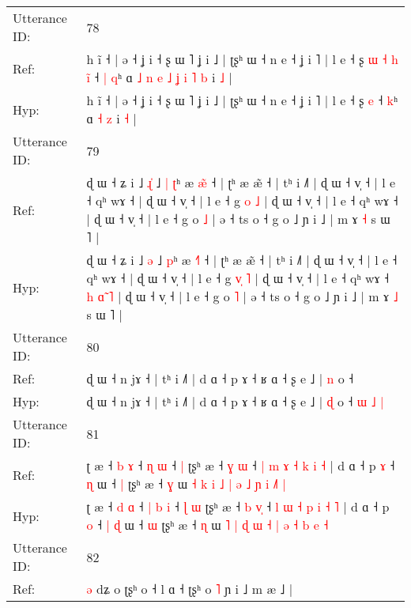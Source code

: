 \documentclass[10pt]{article}
\DeclareRobustCommand{\hl}[1]{{\textcolor{red}{#1}}}
\begin{document}
\begin{longtable}{ll}
\midrule
Utterance ID: & 78 \\
Ref: & h ĩ ˧ | ə ˧ ʝ i ˧ ʂ ɯ ˥ ʝ i ˩ | ʈʂʰ ɯ ˧ n e ˧ ʝ i ˥ | l e ˧ ʂ\hl{ }\hl{ɯ}\hl{ }\hl{˧}\hl{ }\hl{h} \hl{i}\hl{̃} ˧\hl{ }\hl{|} \hl{q}ʰ ɑ\hl{ }\hl{˩}\hl{ }\hl{n}\hl{ }\hl{e}\hl{ }\hl{˩}\hl{ }\hl{ʝ}\hl{ }\hl{i} \hl{˥} \hl{b} i \hl{˩} |
 \\
Hyp: & h ĩ ˧ | ə ˧ ʝ i ˧ ʂ ɯ ˥ ʝ i ˩ | ʈʂʰ ɯ ˧ n e ˧ ʝ i ˥ | l e ˧ ʂ\hl{}\hl{}\hl{}\hl{}\hl{}\hl{} \hl{}\hl{e} ˧\hl{}\hl{} \hl{k}ʰ ɑ\hl{}\hl{}\hl{}\hl{}\hl{}\hl{}\hl{}\hl{}\hl{}\hl{}\hl{}\hl{} \hl{˧} \hl{z} i \hl{˧} |
 \\
\midrule
Utterance ID: & 79 \\
Ref: & ɖ ɯ ˧ ʑ i ˩ \hl{ɻ}\hl{̍} ˩\hl{ }\hl{|} \hl{ʈ}ʰ æ \hl{æ}\hl{̃} ˧ | ʈʰ æ æ̃ ˧ | tʰ i ˩˥ | ɖ ɯ ˧ v̩ ˧ | l e ˧ qʰ wɤ ˧ | ɖ ɯ ˧ v̩ ˧ | l e ˧ g \hl{}\hl{o} \hl{˩} | ɖ ɯ ˧ v̩ ˧ | l e ˧ qʰ wɤ ˧\hl{}\hl{}\hl{}\hl{}\hl{}\hl{}\hl{} | ɖ ɯ ˧ v̩ ˧ | l e ˧ g o \hl{˩} | ə ˧ ts o ˧ g o ˩ ɲ i ˩ | m ɤ \hl{˧} s ɯ ˥ |
 \\
Hyp: & ɖ ɯ ˧ ʑ i ˩ \hl{}\hl{ə} ˩\hl{}\hl{} \hl{p}ʰ æ \hl{˧}\hl{˥} ˧ | ʈʰ æ æ̃ ˧ | tʰ i ˩˥ | ɖ ɯ ˧ v̩ ˧ | l e ˧ qʰ wɤ ˧ | ɖ ɯ ˧ v̩ ˧ | l e ˧ g \hl{v}\hl{̩} \hl{˥} | ɖ ɯ ˧ v̩ ˧ | l e ˧ qʰ wɤ ˧\hl{ }\hl{h}\hl{ }\hl{ɑ}\hl{̃}\hl{ }\hl{˥} | ɖ ɯ ˧ v̩ ˧ | l e ˧ g o \hl{˥} | ə ˧ ts o ˧ g o ˩ ɲ i ˩ | m ɤ \hl{˩} s ɯ ˥ |
 \\
\midrule
Utterance ID: & 80 \\
Ref: & ɖ ɯ ˧ n jɤ ˧ | tʰ i ˩˥ | d ɑ ˧ p ɤ ˧ ʁ ɑ ˧ ʂ e ˩ | \hl{n} o ˧\hl{}\hl{}\hl{}\hl{}\hl{}\hl{}
 \\
Hyp: & ɖ ɯ ˧ n jɤ ˧ | tʰ i ˩˥ | d ɑ ˧ p ɤ ˧ ʁ ɑ ˧ ʂ e ˩ | \hl{ɖ} o ˧\hl{ }\hl{ɯ}\hl{ }\hl{˩}\hl{ }\hl{|}
 \\
\midrule
Utterance ID: & 81 \\
Ref: & ʈ æ ˧ \hl{b} \hl{ɤ} ˧\hl{}\hl{} \hl{ɳ} \hl{ɯ} ˧\hl{}\hl{} \hl{|} ʈʂʰ æ ˧ \hl{ɣ} \hl{}\hl{ɯ} ˧ \hl{|} \hl{m} \hl{ɤ} \hl{˧} \hl{k} \hl{i} \hl{˧} | d ɑ ˧ p \hl{ɤ} ˧\hl{}\hl{} \hl{ɳ} ɯ ˧ \hl{|} ʈʂʰ æ ˧ \hl{ɣ} ɯ \hl{˧} \hl{k} \hl{i} \hl{˩} \hl{|} \hl{ə} \hl{˩} \hl{ɲ} \hl{i} \hl{˩}\hl{˥} \hl{|}
 \\
Hyp: & ʈ æ ˧ \hl{d} \hl{ɑ} ˧\hl{ }\hl{|} \hl{b} \hl{i} ˧\hl{ }\hl{ɭ} \hl{ɯ} ʈʂʰ æ ˧ \hl{b} \hl{v}\hl{̩} ˧ \hl{l} \hl{ɯ} \hl{˧} \hl{p} \hl{i} \hl{˧} \hl{˥} | d ɑ ˧ p \hl{o} ˧\hl{ }\hl{|} \hl{ɖ} ɯ ˧ \hl{ɯ} ʈʂʰ æ ˧ \hl{ɳ} ɯ \hl{˥} \hl{|} \hl{ɖ} \hl{ɯ} \hl{˧} \hl{|} \hl{ə} \hl{˧} \hl{b} \hl{}\hl{e} \hl{˧}
 \\
\midrule
Utterance ID: & 82 \\
Ref: & \hl{}\hl{ə} dʑ o\hl{}\hl{}\hl{}\hl{}\hl{}\hl{}\hl{}\hl{}\hl{}\hl{}\hl{}\hl{} ʈʂʰ o ˧ l ɑ ˧ ʈʂʰ o \hl{˥} ɲ i ˩ m æ ˩ |

\end{longtable}
\end{document}
